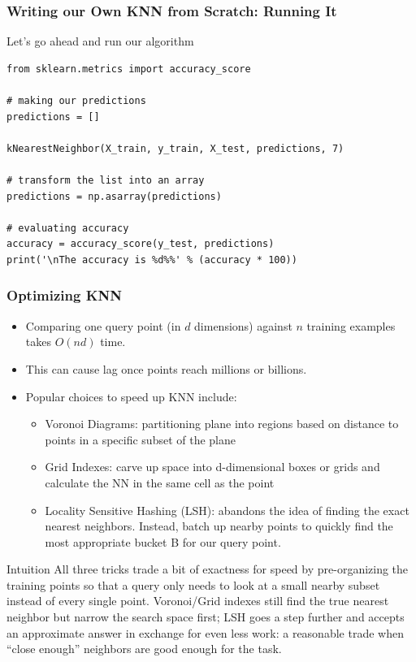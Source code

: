 \begin{frame}[fragile]\frametitle{Writing our Own KNN from Scratch: Running It}
Let's go ahead and run our algorithm
\begin{lstlisting}
from sklearn.metrics import accuracy_score

# making our predictions
predictions = []

kNearestNeighbor(X_train, y_train, X_test, predictions, 7)

# transform the list into an array
predictions = np.asarray(predictions)

# evaluating accuracy
accuracy = accuracy_score(y_test, predictions)
print('\nThe accuracy is %d%%' % (accuracy * 100))
\end{lstlisting}
\end{frame}


\begin{frame}[fragile]\frametitle{Optimizing KNN}
\begin{itemize}
\item Comparing one query point (in $d$ dimensions) against $n$ training examples takes $O(nd)$ time.
\item This can cause lag once points reach millions or billions.
\item Popular choices to speed up KNN include:
\begin{itemize}
\item  Voronoi Diagrams: partitioning plane into regions
based on distance to points in a specific subset of
the plane
\item  Grid Indexes: carve up space into d-dimensional
boxes or grids and calculate the NN in the same cell
as the point
\item  Locality Sensitive Hashing (LSH): abandons
the idea of finding the exact nearest neighbors. Instead, batch up nearby points to quickly
find the most appropriate bucket B for our query point.
\end{itemize}
\end{itemize}

\begin{block}{Intuition}
All three tricks trade a bit of exactness for speed by pre-organizing the training points so
that a query only needs to look at a small nearby subset instead of every single point.
Voronoi/Grid indexes still find the true nearest neighbor but narrow the search space first;
LSH goes a step further and accepts an approximate answer in exchange for even less work:
a reasonable trade when ``close enough'' neighbors are good enough for the task.
\end{block}
\end{frame}

